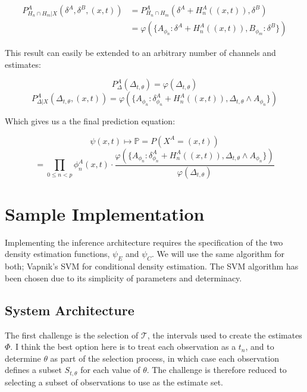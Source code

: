 \documentclass[10pt]{article}
\begin{document}
\begin{align}
P_{H_n \cap H_m | X}^A \left( \delta^A, \delta^B, (x,t) \right) &= P_{H_n \cap H_m}^A \left( \delta^A + H_n^A((x,t)), \delta^B \right) \nonumber \\
&= \varphi \left( \{ A_{\phi_n}:\delta^A + H_n^A((x,t)), B_{\phi_m}: \delta^B \} \right)
\end{align}

This result can easily be extended to an arbitrary number of channels and estimates:

\begin{equation} P_\Delta^A \left( \Delta_{t,\theta} \right) = \varphi \left( \Delta_{t,\theta} \right) \end{equation}
\begin{equation} P_{\Delta|X}^A \left( \Delta_{t,\theta}, (x,t) \right) = \varphi \left( \{ A_{\phi_n} : \delta_{\phi_n}^A + H_n^A((x,t)), \Delta_{t,\theta} \land A_{\phi_n} \} \right) \end{equation}

Which gives us a the final prediction equation:

\[ \psi(x,t) \mapsto \mathbb{P} = P(X^A = (x,t) ) \]
\begin{equation} 
= \prod_{0 \le n < p} \phi_n^A( x, t) \cdot \frac{ \varphi \left( \{ A_{\phi_n} : \delta_{\phi_n}^A + H_n^A((x,t)), \Delta_{t,\theta} \land A_{\phi_n} \} \right) }{ \varphi( \Delta_{t,\theta} ) }
\end{equation}

\section{Sample Implementation}
Implementing the inference architecture requires the specification of the two density estimation functions, \( \psi_E \) and \( \psi_C \).  We will use the same algorithm for both; Vapnik's SVM for conditional density estimation.  The SVM algorithm has been chosen due to its simplicity of parameters and determinacy. 

 
\subsection{System Architecture}
The first challenge is the selection of \( \mathcal{T} \), the intervals used to create the estimates \( \Phi \).  I think the best option here is to treat each observation as a \( t_n \), and to determine \( \theta \) as part of the selection process, in which case each observation defines a subset \( S_{t,\theta} \) for each value of \( \theta \).  The challenge is therefore reduced to selecting a subset of observations to use as the estimate set.
\end{document}
